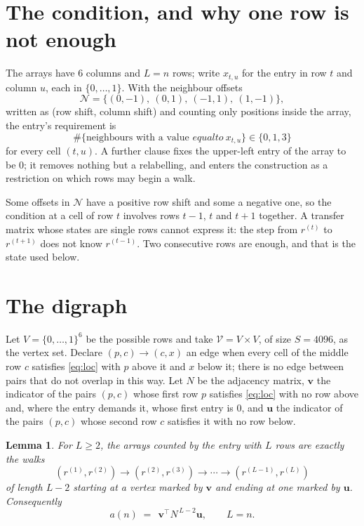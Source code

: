 \documentclass[11pt,a4paper]{article}
\theoremstyle{plain}
\newtheorem{lemma}[theorem]{Lemma}
\theoremstyle{definition}
\begin{document}
\section{The condition, and why one row is not enough}

The arrays have $6$ columns and $L=n$ rows; write $x_{t,u}$ for the entry in
row $t$ and column $u$, each in $\{0,\dots,1\}$. With the neighbour offsets
\[
\mathcal N=\{(0,-1),\ (0,1),\ (-1,1),\ (1,-1)\},
\]
written as (row shift, column shift) and counting only positions inside the array, the
entry's requirement is
\begin{equation}\label{eq:loc}
\#\{\text{neighbours with a value }equal to\ x_{t,u}\}\in\{0,1,3\}
\end{equation}
for every cell $(t,u)$. A further clause fixes the upper-left entry of the array to be $0$; it removes nothing but a relabelling, and enters the construction as a restriction on which rows may begin a walk.

Some offsets in $\mathcal N$ have a positive row shift and some a negative one, so the
condition at a cell of row $t$ involves rows $t-1$, $t$ and $t+1$ together. A transfer
matrix whose states are single rows cannot express it: the step from $r^{(t)}$ to
$r^{(t+1)}$ does not know $r^{(t-1)}$. Two consecutive rows are enough, and that is
the state used below.

\section{The digraph}

Let $V=\{0,\dots,1\}^{6}$ be the possible rows and take
$\mathcal V=V\times V$, of size $S=4096$, as the vertex set. Declare $(p,c)\to(c,x)$ an edge
when every cell of the middle row $c$ satisfies \eqref{eq:loc} with $p$ above it and $x$
below it; there is no edge between pairs that do not overlap in this way. Let $N$ be the
adjacency matrix, $\mathbf{v}$ the indicator of the pairs $(p,c)$ whose first row $p$
satisfies \eqref{eq:loc} with no row above and, where the entry demands it, whose first entry is $0$, and $\mathbf{u}$ the indicator of
the pairs $(p,c)$ whose second row $c$ satisfies it with no row below.

\begin{lemma}\label{lem:walk}
For $L\ge2$, the arrays counted by the entry with $L$ rows are exactly the walks
\[
(r^{(1)},r^{(2)})\to(r^{(2)},r^{(3)})\to\cdots\to(r^{(L-1)},r^{(L)})
\]
of length $L-2$ starting at a vertex marked by $\mathbf{v}$ and ending at one marked by
$\mathbf{u}$. Consequently
\[
a(n)\;=\;\,\mathbf{v}^{\!\top}N^{\,L-2}\mathbf{u},\qquad L=n .
\]
\end{lemma}
\end{document}
